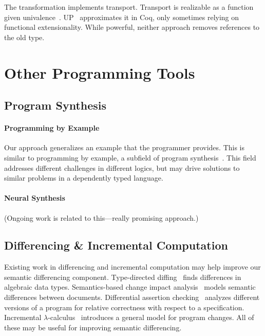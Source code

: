 The \toolnamec transformation implements transport.
Transport is realizable as a function given univalence~\cite{univalent2013homotopy}.
UP~\cite{tabareau2017equivalences} approximates it
in Coq, only sometimes relying on functional extensionality.
While powerful, neither approach removes references to the old type. %

\section{Other Programming Tools}

\subsection{Program Synthesis}


\paragraph{Programming by Example}
Our approach generalizes an example that the programmer provides.
This is similar to programming by example, a subfield of 
program synthesis~\cite{DBLP:journals/ftpl/GulwaniPS17}. 
This field addresses different challenges in different logics,
but may drive solutions to similar problems in a dependently typed language.

\paragraph{Neural Synthesis} (Ongoing work is related to this---really promising approach.)

\subsection{Differencing \& Incremental Computation}


Existing work in differencing and incremental computation may help 
improve our semantic differencing component.
Type-directed diffing~\cite{Miraldo:2017:TDS:3122975.3122976}
finds differences in algebraic data types.
Semantics-based change impact analysis~\cite{Autexier:2010:SCI:1860559.1860580} models semantic differences
between documents.
Differential assertion checking~\cite{differential-assertion-checking-2} analyzes different
versions of a program for relative correctness with respect to a specification.
Incremental $\lambda$-calculus~\cite{Cai:2014:TCH:2594291.2594304} introduces a general model for program changes.
All of these may be useful for improving semantic differencing.


